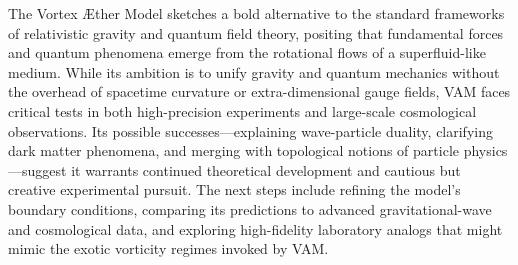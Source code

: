 The Vortex Æther Model sketches a bold alternative to the standard frameworks of relativistic gravity and quantum field theory, positing that fundamental forces and quantum phenomena emerge from the rotational flows of a superfluid-like medium. While its ambition is to unify gravity and quantum mechanics without the overhead of spacetime curvature or extra-dimensional gauge fields, VAM faces critical tests in both high-precision experiments and large-scale cosmological observations. Its possible successes—explaining wave-particle duality, clarifying dark matter phenomena, and merging with topological notions of particle physics—suggest it warrants continued theoretical development and cautious but creative experimental pursuit. The next steps include refining the model's boundary conditions, comparing its predictions to advanced gravitational-wave and cosmological data, and exploring high-fidelity laboratory analogs that might mimic the exotic vorticity regimes invoked by VAM.
